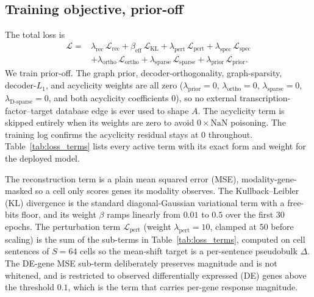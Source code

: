 \subsection{Training objective, prior-off}
The total loss is
\begin{equation}
\begin{split}
\mathcal{L}
={}& \lambda_{\mathrm{rec}}\,\mathcal{L}_{\mathrm{rec}}
+ \beta_{\mathrm{eff}}\,\mathcal{L}_{\mathrm{KL}}
+ \lambda_{\mathrm{pert}}\,\mathcal{L}_{\mathrm{pert}}
+ \lambda_{\mathrm{spec}}\,\mathcal{L}_{\mathrm{spec}}\\
&+ \lambda_{\mathrm{ortho}}\,\mathcal{L}_{\mathrm{ortho}}
+ \lambda_{\mathrm{sparse}}\,\mathcal{L}_{\mathrm{sparse}}
+ \lambda_{\mathrm{prior}}\,\mathcal{L}_{\mathrm{prior}} .
\end{split}
\label{eq:total_loss}
\end{equation}
We train prior-off. The graph prior, decoder-orthogonality, graph-sparsity, decoder-$L_1$,
and acyclicity weights are all zero
($\lambda_{\mathrm{prior}}{=}0$, $\lambda_{\mathrm{ortho}}{=}0$, $\lambda_{\mathrm{sparse}}{=}0$,
$\lambda_{\mathrm{D\text{-}sparse}}{=}0$, and both acyclicity coefficients $0$),
so no external transcription-factor--target database edge is ever used to shape $A$. The
acyclicity term is skipped entirely when its weights are zero to avoid $0\times\text{NaN}$
poisoning. The training log confirms the acyclicity residual stays at $0$ throughout.
Table~\ref{tab:loss_terms} lists every active term with its exact form and weight for the
deployed model.

The reconstruction term is a plain mean squared error (MSE), modality-gene-masked so a
cell only scores genes its modality observes. The Kullback--Leibler (KL) divergence is the
standard diagonal-Gaussian variational term with a free-bits floor, and its weight $\beta$
ramps linearly from $0.01$ to $0.5$ over the first $30$ epochs. The perturbation term
$\mathcal{L}_{\mathrm{pert}}$ (weight $\lambda_{\mathrm{pert}}{=}10$, clamped at $50$ before
scaling) is the sum of the sub-terms in Table~\ref{tab:loss_terms}, computed on cell
sentences of $S{=}64$ cells so the mean-shift target is a per-sentence pseudobulk $\Delta$.
The DE-gene MSE sub-term deliberately preserves magnitude and is not whitened, and is
restricted to observed differentially expressed (DE) genes above the threshold $0.1$, which
is the term that carries per-gene response magnitude.

